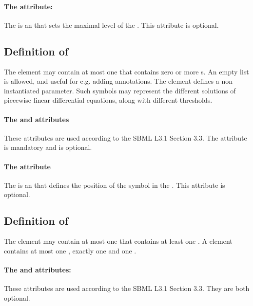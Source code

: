 \paragraph{The  attribute:}
The  is an  that sets the maximal level of the . This attribute is optional.

\bigskip
\subsection*{Definition of } %
The  element may contain at most one  that contains zero or more s. An empty list is allowed, and useful for e.g. adding annotations.
The  element defines a non instantiated parameter. Such symbols may represent the different solutions of piecewise linear differential equations, along with different thresholds.

\paragraph{The  and  attributes}
These attributes are used according to the SBML L3.1 Section 3.3. The attribute  is mandatory and  is optional. 

\paragraph{The  attribute}
The  is an  that defines the position of the symbol in the . This attribute is optional.

\bigskip
\subsection*{Definition of  } %
The  element may contain at most one  that contains at least one .
A  element contains at most one , exactly one  and one .

\paragraph{The  and  attributes:}
These attributes are used according to the SBML L3.1 Section 3.3. They are both optional. 

